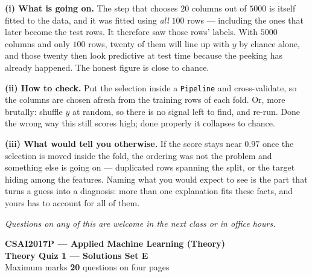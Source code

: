\documentclass[10pt,a4paper]{article}
\newcommand{\SetLetter}{}
\begin{document}
\vspace{4pt}

\textbf{(i) What is going on.} The step that chooses $20$ columns out of $5000$ is itself fitted to the data, and it was fitted using \emph{all} $100$ rows --- including the ones that later become the test rows. It therefore saw those rows' labels. With $5000$ columns and only $100$ rows, twenty of them will line up with $y$ by chance alone, and those twenty then look predictive at test time because the peeking has already happened. The honest figure is close to chance.\par\vspace{1mm}\textbf{(ii) How to check.} Put the selection inside a \texttt{Pipeline} and cross-validate, so the columns are chosen afresh from the training rows of each fold. Or, more brutally: shuffle $y$ at random, so there is no signal left to find, and re-run. Done the wrong way this still scores high; done properly it collapses to chance.\par\vspace{1mm}\textbf{(iii) What would tell you otherwise.} If the score stays near $0.97$ once the selection is moved inside the fold, the ordering was not the problem and something else is going on --- duplicated rows spanning the split, or the target hiding among the features. Naming what you would expect to see is the part that turns a guess into a diagnosis: more than one explanation fits these facts, and yours has to account for all of them.

\vfill

{\footnotesize\itshape Questions on any of this are welcome in the next class or in office hours.}

\newpage


\renewcommand{\SetLetter}{E}\setcounter{page}{1}

\begin{center}
{\large\bfseries CSAI2017P --- Applied Machine Learning (Theory)}\\[2pt]
{\large\bfseries Theory Quiz 1 --- Solutions \quad\textbullet\quad Set E}\\[3pt]
{\small Maximum marks \textbf{20} \quad\textbullet{} questions on four pages}
\end{center}
\vspace{2pt}

\noindent{}
\vspace{3pt}
\end{document}
